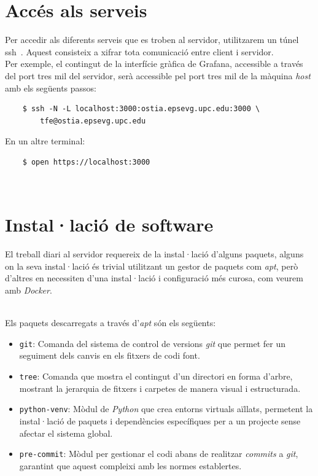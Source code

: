 \clearpage

\section*{Accés als serveis}\label{sec:server-access}

\noindent
Per accedir als diferents serveis que es troben al servidor, utilitzarem un túnel \gls{ssh}~\cite{tunel-ssh}.
Aquest consisteix a xifrar tota comunicació entre client i servidor. \\

\noindent
Per exemple, el contingut de la interfície gràfica de Grafana, accessible a través del port tres mil del servidor,
serà accessible pel port tres mil de la màquina \textit{host} amb els següents passos:

\begin{verbatim}
    $ ssh -N -L localhost:3000:ostia.epsevg.upc.edu:3000 \
        tfe@ostia.epsevg.upc.edu
\end{verbatim}

\noindent
En un altre terminal:

\begin{verbatim}
    $ open https://localhost:3000
\end{verbatim}

\noindent \\
\section*{Instal·lació de software}\label{sec:software-installation}

El treball diari al servidor requereix de la instal·lació d'alguns paquets, alguns on la seva instal·lació és trivial utilitzant un gestor de paquets com \textit{\textit{apt}}, però d'altres en necessiten d'una instal·lació i configuració més curosa, com veurem amb \textit{\gls{Docker}}.

\noindent \\
Els paquets descarregats a través d'\textit{\gls{apt}} són els següents:

\begin{itemize}
    \item \texttt{git}: Comanda del sistema de control de versions \textit{\gls{git}} que permet fer un seguiment dels canvis en els fitxers de codi font.
    \item \texttt{tree}: Comanda que mostra el contingut d'un directori en forma d'arbre, mostrant la jerarquia de fitxers i carpetes de manera visual i estructurada.
    \item \texttt{python-venv}: Mòdul de \textit{Python} que crea entorns virtuals aïllats, permetent la instal·lació de paquets i dependències específiques per a un projecte sense afectar el sistema global.
    \item \texttt{pre-commit}: Mòdul per gestionar el codi abans de realitzar \textit{\gls{commit}s} a \textit{\gls{git}}, garantint que aquest compleixi amb les normes establertes.
\end{itemize}

